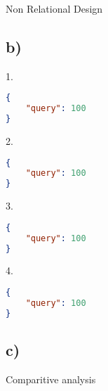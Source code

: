 \documentclass{article}
\begin{document}
Non Relational Design

\subsection*{\small b)}

\hspace{0cm}1.
\begin{lstlisting}[language=json]
{
    "query": 100
} 
\end{lstlisting} 
\hspace{0cm}2.
\begin{lstlisting}[language=json]
{                   
    "query": 100
}
\end{lstlisting}
\hspace{0cm}3. 
\begin{lstlisting}[language=json]
{
    "query": 100
}
\end{lstlisting}
\hspace{0cm}4. 
\begin{lstlisting}[language=json]
{
    "query": 100
}
\end{lstlisting}

\subsection*{\small c)}

Comparitive analysis
\end{document}
